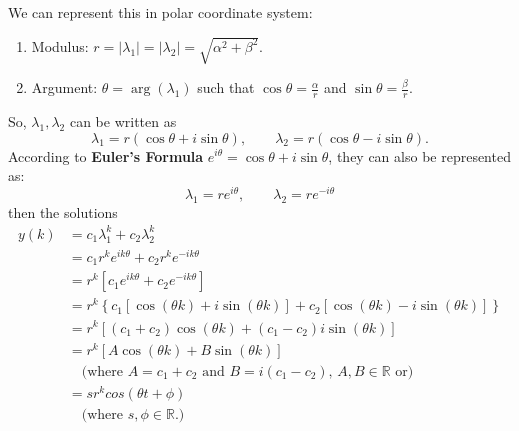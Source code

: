 \begin{remark*}
    We can represent this in polar coordinate system:
    \begin{enumerate}
        \item Modulus: $r = |\lambda_1| = |\lambda_2| = \sqrt{\alpha ^{2} + \beta ^{2}}$.
        \item Argument: $\theta = \arg(\lambda_1)$ such that $\cos\theta = \frac{\alpha}{r}$ and $\sin\theta = \frac{\beta}{r}$.
    \end{enumerate}
    So, $\lambda_1,\lambda_2$ can be written as \[
        \lambda_1 = r(\cos\theta+i\sin\theta),\qquad\lambda_2=r(\cos\theta-i\sin\theta).
    \]
    According to \textbf{Euler's Formula} $e ^{i\theta} = \cos\theta+i\sin\theta$, they can also be represented as: \[
        \lambda_1 = re ^{i\theta}, \qquad \lambda_2 = re ^{-i\theta}
    \]
    then the solutions \begin{align*}
        y(k) & = c_1 \lambda_1 ^{k} + c_2 \lambda_2 ^{k}                                                                                      \\
             & = c_1 r ^{k}e ^{ik\theta} + c_2 r ^{k} e ^{-ik\theta}                                                                          \\
             & = r ^{k}[c_1 e ^{ik\theta} + c_2 e ^{-ik\theta}]                                                                               \\
             & = r ^{k}\left\{c_1\left[\cos(\theta k) + i \sin(\theta k)\right] + c_2 \left[\cos(\theta k) - i \sin(\theta k)\right] \right\} \\
             & = r ^{k}\left[(c_1+c_2)\cos(\theta k) + (c_1 -c_2)i \sin(\theta k)\right]                                                      \\
             & = r ^{k}\left[A\cos(\theta k) + B \sin(\theta k)\right]                                                                        \\
             & \quad \text{(where $A = c_1+c_2$ and $B=i(c_1-c_2)$, $A,B \in \mathbb{R}$ or)}                                                 \\
             & = sr ^{k} cos(\theta t + \phi)                                                                                                 \\
             & \quad \text{(where $s, \phi \in \mathbb{R}$.)}                                                                                 \\
    \end{align*}
\end{remark*}

